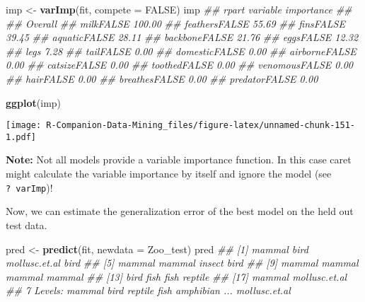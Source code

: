\documentclass[
  notitlepage]{book}
\newenvironment{Shaded}{\begin{snugshade}}{\end{snugshade}}
\newcommand{\CommentTok}[1]{\textcolor[rgb]{0.56,0.35,0.01}{\textit{#1}}}
\newcommand{\DataTypeTok}[1]{\textcolor[rgb]{0.13,0.29,0.53}{#1}}
\newcommand{\KeywordTok}[1]{\textcolor[rgb]{0.13,0.29,0.53}{\textbf{#1}}}
\newcommand{\NormalTok}[1]{#1}
\newcommand{\OtherTok}[1]{\textcolor[rgb]{0.56,0.35,0.01}{#1}}
\newcommand{\StringTok}[1]{\textcolor[rgb]{0.31,0.60,0.02}{#1}}
\begin{document}
\begin{Shaded}
\begin{Highlighting}[]
\NormalTok{imp \textless{}{-}}\StringTok{ }\KeywordTok{varImp}\NormalTok{(fit, }\DataTypeTok{compete =} \OtherTok{FALSE}\NormalTok{)}
\NormalTok{imp}
\CommentTok{\#\# rpart variable importance}
\CommentTok{\#\# }
\CommentTok{\#\#               Overall}
\CommentTok{\#\# milkFALSE      100.00}
\CommentTok{\#\# feathersFALSE   55.69}
\CommentTok{\#\# finsFALSE       39.45}
\CommentTok{\#\# aquaticFALSE    28.11}
\CommentTok{\#\# backboneFALSE   21.76}
\CommentTok{\#\# eggsFALSE       12.32}
\CommentTok{\#\# legs             7.28}
\CommentTok{\#\# tailFALSE        0.00}
\CommentTok{\#\# domesticFALSE    0.00}
\CommentTok{\#\# airborneFALSE    0.00}
\CommentTok{\#\# catsizeFALSE     0.00}
\CommentTok{\#\# toothedFALSE     0.00}
\CommentTok{\#\# venomousFALSE    0.00}
\CommentTok{\#\# hairFALSE        0.00}
\CommentTok{\#\# breathesFALSE    0.00}
\CommentTok{\#\# predatorFALSE    0.00}
\end{Highlighting}
\end{Shaded}

\begin{Shaded}
\begin{Highlighting}[]
\KeywordTok{ggplot}\NormalTok{(imp)}
\end{Highlighting}
\end{Shaded}

\texttt{[image: R-Companion-Data-Mining\_files/figure-latex/unnamed-chunk-151-1.pdf]}

\textbf{Note:} Not all models provide a variable importance function. In this
case caret might calculate the variable importance by itself and ignore
the model (see \texttt{?\ varImp})!

Now, we can estimate the generalization error of the best model on the
held out test data.

\begin{Shaded}
\begin{Highlighting}[]
\NormalTok{pred \textless{}{-}}\StringTok{ }\KeywordTok{predict}\NormalTok{(fit, }\DataTypeTok{newdata =}\NormalTok{ Zoo\_test)}
\NormalTok{pred}
\CommentTok{\#\#  [1] mammal        bird          mollusc.et.al bird         }
\CommentTok{\#\#  [5] mammal        mammal        insect        bird         }
\CommentTok{\#\#  [9] mammal        mammal        mammal        mammal       }
\CommentTok{\#\# [13] bird          fish          fish          reptile      }
\CommentTok{\#\# [17] mammal        mollusc.et.al}
\CommentTok{\#\# 7 Levels: mammal bird reptile fish amphibian ... mollusc.et.al}
\end{Highlighting}
\end{Shaded}
\end{document}
